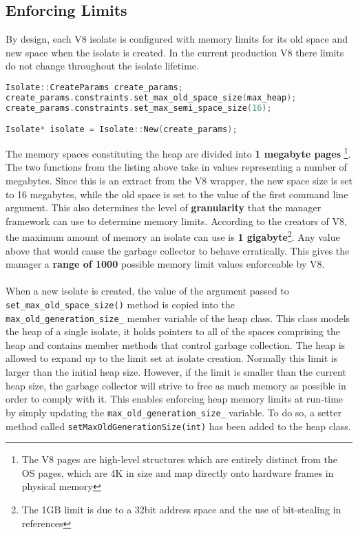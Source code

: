 \documentclass{l4proj}
\begin{document}
\subsection{Enforcing Limits}
\hspace*{3em} By design, each V8 isolate is configured with memory limits for its old space and new space when the isolate is created. In the current production V8 there limits do not change throughout the isolate lifetime.
\begin{lstlisting}[language=cpp]
Isolate::CreateParams create_params;
create_params.constraints.set_max_old_space_size(max_heap);
create_params.constraints.set_max_semi_space_size(16);

Isolate* isolate = Isolate::New(create_params);
\end{lstlisting}
\hspace*{3em} The memory spaces constituting the heap are divided into \textbf{1 megabyte pages}
\footnote{The V8 pages are high-level structures which are 
entirely distinct from the OS pages, which are 4K in size and map directly onto hardware frames in physical memory}.
The two functions from the listing above take in values representing a number of megabytes. Since this is an extract from the V8 wrapper, the new space size is set to 16 megabytes, while the old space is set to the value of the first command line argument. This also determines the level of \textbf{granularity} that the manager framework can use to determine memory limits. According to the creators of V8, the maximum amount of memory an isolate can use is \textbf{1 gigabyte}\footnote{The 1GB limit is due to a 32bit address space and the use of bit-stealing in references}. Any value above that would cause the garbage collector to behave erratically.\cite{v8sizebug} This gives the manager a \textbf{range of 1000} possible memory limit values enforceable by V8.
\\\\
\hspace*{3em} When a new isolate is created, the value of the argument passed to \texttt{set\_max\_old\_space\_size()} method is copied into the \texttt{max\_old\_generation\_size\_} member variable of the heap class. This class models the heap of a single isolate, it holds pointers to all of the spaces comprising the heap and contains member methods that control garbage collection. The heap is allowed to expand up to the limit set at isolate creation. Normally this limit is larger than the initial heap size. However, if the limit is smaller than the current heap size, the garbage collector will strive to free as much memory as possible in order to comply with it. This enables enforcing heap memory limits at run-time by simply updating the  \texttt{max\_old\_generation\_size\_} variable. To do so, a setter method called \texttt{setMaxOldGenerationSize(int)} has been added to the heap class.
\end{document}
